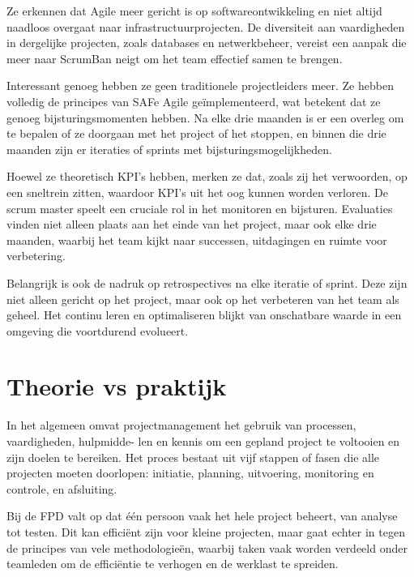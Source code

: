 \documentclass[dutch]{hogent-article}
\begin{document}
Ze erkennen dat Agile meer gericht is op softwareontwikkeling en niet altijd naadloos overgaat naar infrastructuurprojecten. De diversiteit aan vaardigheden in dergelijke projecten, zoals databases en netwerkbeheer, vereist een aanpak die meer naar ScrumBan neigt om het team effectief samen te brengen.
\newline

Interessant genoeg hebben ze geen traditionele projectleiders meer. Ze hebben volledig de principes van SAFe Agile geïmplementeerd, wat betekent dat ze genoeg bijsturingsmomenten hebben. Na elke drie maanden is er een overleg om te bepalen of ze doorgaan met het project of het stoppen, en binnen die drie maanden zijn er iteraties of sprints met bijsturingsmogelijkheden.
\newline

Hoewel ze theoretisch KPI's hebben, merken ze dat, zoals zij het verwoorden, op een sneltrein zitten, waardoor KPI's uit het oog kunnen worden verloren. De scrum master speelt een cruciale rol in het monitoren en bijsturen. Evaluaties vinden niet alleen plaats aan het einde van het project, maar ook elke drie maanden, waarbij het team kijkt naar successen, uitdagingen en ruimte voor verbetering.
\newline

Belangrijk is ook de nadruk op retrospectives na elke iteratie of sprint. Deze zijn niet alleen gericht op het project, maar ook op het verbeteren van het team als geheel. Het continu leren en optimaliseren blijkt van onschatbare waarde in een omgeving die voortdurend evolueert.
\newline

\section{Theorie vs praktijk}
\label{sec:theorie-vs-pratijk-sfpd}

In het algemeen omvat projectmanagement het gebruik van processen, vaardigheden, hulpmidde- len en kennis om een gepland project te voltooien en zijn doelen te bereiken. Het proces bestaat uit vijf stappen of fasen die alle projecten moeten doorlopen: initiatie, planning, uitvoering, monitoring en controle, en afsluiting.
\newline

Bij de FPD valt op dat één persoon vaak het hele project beheert, van analyse tot testen. Dit kan efficiënt zijn voor kleine projecten, maar gaat echter in tegen de principes van vele methodologie\"en, waarbij taken vaak worden verdeeld onder teamleden om de efficiëntie te verhogen en de werklast te spreiden.
\end{document}
